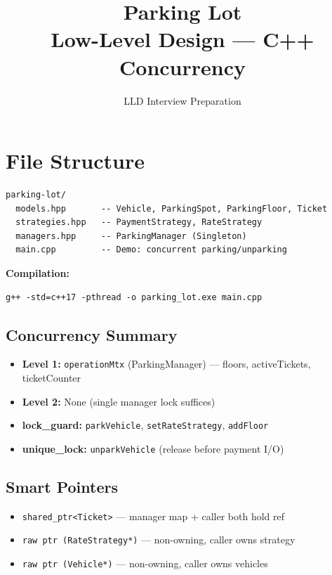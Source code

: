 \documentclass[11pt,a4paper]{article}
\title{\Huge\textbf{Parking Lot}\\[0.3em]\Large Low-Level Design --- C++ Concurrency}
\author{LLD Interview Preparation}
\date{}
\begin{document}
\maketitle
\tableofcontents
\newpage

\section{File Structure}
\begin{verbatim}
parking-lot/
  models.hpp       -- Vehicle, ParkingSpot, ParkingFloor, Ticket
  strategies.hpp   -- PaymentStrategy, RateStrategy
  managers.hpp     -- ParkingManager (Singleton)
  main.cpp         -- Demo: concurrent parking/unparking
\end{verbatim}

\textbf{Compilation:}
\begin{verbatim}
g++ -std=c++17 -pthread -o parking_lot.exe main.cpp
\end{verbatim}

\subsection{Concurrency Summary}
\begin{itemize}
    \item \textbf{Level 1:} \texttt{operationMtx} (ParkingManager) --- floors, activeTickets, ticketCounter
    \item \textbf{Level 2:} None (single manager lock suffices)
    \item \textbf{lock\_guard:} \texttt{parkVehicle}, \texttt{setRateStrategy}, \texttt{addFloor}
    \item \textbf{unique\_lock:} \texttt{unparkVehicle} (release before payment I/O)
\end{itemize}

\subsection{Smart Pointers}
\begin{itemize}
    \item \texttt{shared\_ptr<Ticket>} --- manager map + caller both hold ref
    \item \texttt{raw ptr (RateStrategy*)} --- non-owning, caller owns strategy
    \item \texttt{raw ptr (Vehicle*)} --- non-owning, caller owns vehicles
\end{itemize}
\end{document}
